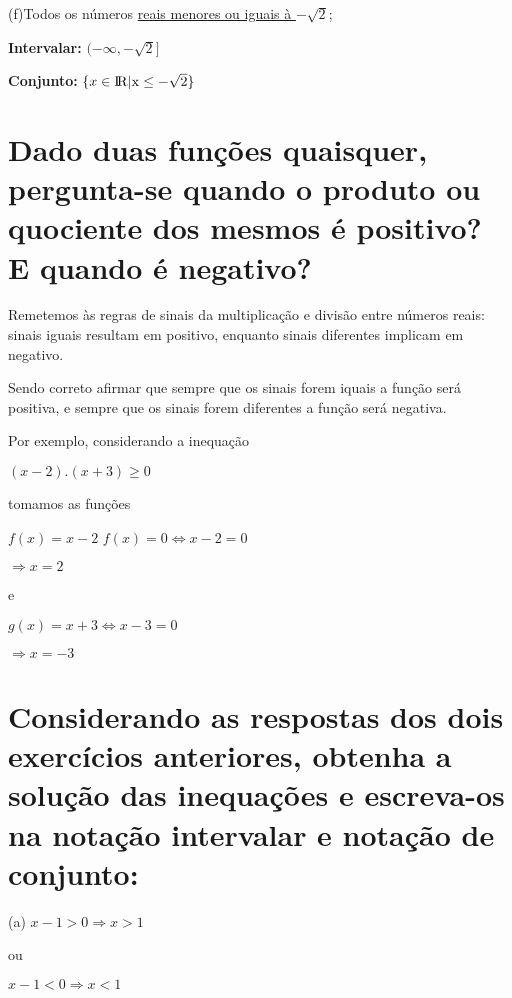 \documentclass{article}
\begin{document}
		\vspace{5mm}
		(f)Todos os números \underline{reais menores ou iguais à $-\sqrt{2}$};

			\hspace{5mm} \textbf{Intervalar:} $(-\infty,-\sqrt{2}]$

			\hspace{5mm}  \textbf{Conjunto:} $\{x \in \rm I\!R | x \leq -\sqrt{2} \}$

	\section{Dado duas funções quaisquer, pergunta-se quando o produto ou quociente dos mesmos é positivo? E quando é negativo?}

		\hspace{5mm}Remetemos às regras de sinais da multiplicação e divisão entre números reais: sinais iguais resultam em positivo, enquanto sinais diferentes implicam em negativo.

		Sendo correto afirmar que sempre que os sinais forem iquais a função será positiva, e sempre que os sinais forem
		diferentes a função será negativa.

		\vspace{5mm}
		Por exemplo, considerando a inequação

		$(x - 2).(x + 3) \geq 0$

		tomamos as funções

		$f(x) = x - 2$
		$f(x) = 0 \Leftrightarrow x - 2 = 0$

		\hspace{5mm} $\Rightarrow x = 2$

		e

		$g(x) = x + 3 \Leftrightarrow x - 3 = 0$

		\hspace{5mm} $\Rightarrow x = -3$

	\section{Considerando as respostas dos dois exercícios anteriores, obtenha a solução das inequações e escreva-os na notação intervalar e notação de conjunto:}

		\hspace{4mm} (a) $ x - 1 > 0 \Rightarrow x > 1$

		\hspace{10mm}ou

		\hspace{5mm} $ x - 1 < 0 \Rightarrow x < 1$
\end{document}
